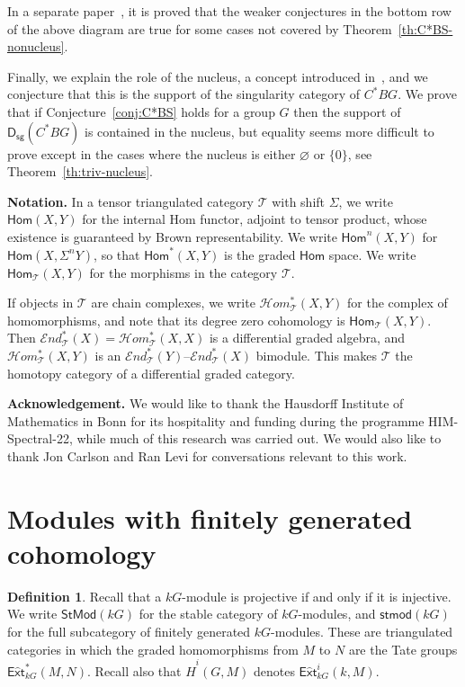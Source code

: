 \documentclass[12pt]{amsart}
\newcommand{\DD}{\mathsf{D}}%
\newcommand{\Dsg}{\DD_{\mathsf{sg}}}%
\newcommand{\iEnd}{\mathcal{E}\mathit{nd}}%
\newcommand{\tExt}{\mathsf{E\widehat{\phantom{\dot{}}x}t}}
\newcommand{\Hom}{\mathsf{Hom}}
\newcommand{\iHom}{\mathcal{H}\mathit{om}}%
\newcommand{\kG}{\kk G}
\newcommand{\kk}{k}
\newcommand{\stmod}{\mathsf{stmod}}
\newcommand{\StMod}{\mathsf{StMod}}
\newcommand{\cT}{\mathcal{T}}
\numberwithin{equation}{section}
\theoremstyle{plain}
\theoremstyle{definition}
\newtheorem{definition}[equation]{Definition}
\theoremstyle{remark}
\begin{document}
In a separate paper~\cite{Benson/Carlson:bc19},
it is proved that the weaker conjectures in the bottom row of the above
diagram are true for some cases not covered by Theorem~\ref{th:C*BS-nonucleus}.\bigskip

Finally, we explain the role of the nucleus, a concept introduced
in~\cite{Benson:1995a,Benson/Carlson/Robinson:1990a}, and we
conjecture that this is the support of the singularity category of
$C^*BG$. We prove that if Conjecture~\ref{conj:C*BS} holds for a group
$G$ then the support of $\Dsg(C^*BG)$ is contained in the nucleus,
but equality seems more difficult to prove except in the cases where
the nucleus is either $\varnothing$ or $\{0\}$, see Theorem~\ref{th:triv-nucleus}.\bigskip

\noindent
{\bf Notation.} In a tensor triangulated category $\cT$ with shift $\Sigma$, we write
$\Hom(X,Y)$ for the internal Hom functor, adjoint to tensor
product, whose existence is guaranteed by Brown representability.
We write $\Hom^n(X,Y)$ for $\Hom(X,\Sigma^n Y)$, so that $\Hom^*(X,Y)$
is the graded $\Hom$ space. We write $\Hom_\cT(X,Y)$ for the
morphisms in the category $\cT$.

If objects in $\cT$ are chain complexes, we write $\iHom^*_{\cT}(X,Y)$
for the complex of homomorphisms, and note that its degree zero
cohomology is $\Hom_{\cT}(X,Y)$. Then  $\iEnd^*_{\cT}(X)=
\iHom^*_{\cT}(X,X)$ is a differential
graded algebra, and $\iHom^*_{\cT}(X,Y)$ is an
$\iEnd^*_{\cT}(Y)$--$\iEnd^*_{\cT}(X)$ bimodule. This makes $\cT$ the
homotopy category of a differential graded category.\bigskip

\noindent
{\bf Acknowledgement.} We would like to thank the Hausdorff Institute
of Mathematics in Bonn for its hospitality and funding during the
programme HIM-Spectral-22, while much of this
research was carried out. We would also like to thank Jon Carlson and
Ran Levi for conversations relevant to this work.

\section{Modules with finitely generated cohomology}

\begin{definition}
Recall that a $\kG$-module is projective if and only if it is injective.
We write $\StMod(\kG)$ for the stable category of $\kG$-modules,
and $\stmod(\kG)$ for the full subcategory of finitely generated
$\kG$-modules. These are triangulated categories in which the graded
homomorphisms from $M$ to $N$ are the Tate groups $\tExt^*_{\kG}(M,N)$. Recall also
that $\hat H^i(G,M)$ denotes $\tExt^i_{\kG}(\kk,M)$.
\end{definition}
\end{document}
